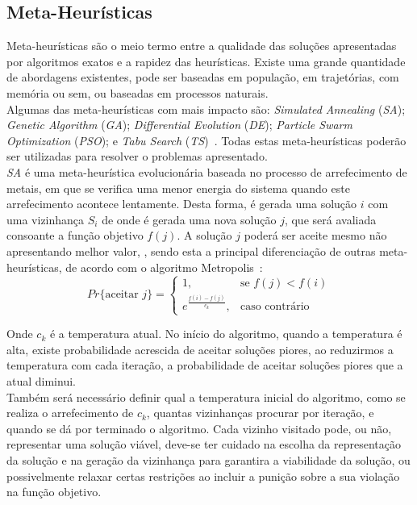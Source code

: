 \subsection{Meta-Heurísticas}

Meta-heurísticas são o meio termo entre a qualidade das soluções apresentadas por algoritmos exatos e a rapidez das heurísticas. Existe uma grande quantidade de abordagens existentes, pode ser baseadas em população, em trajetórias, com memória ou sem, ou baseadas em processos naturais.\\
Algumas das meta-heurísticas com mais impacto são: \textit{Simulated Annealing} (\textit{SA}); \textit{Genetic Algorithm} (\textit{GA}); \textit{Differential Evolution} (\textit{DE}); \textit{Particle Swarm Optimization} (\textit{PSO}); e \textit{Tabu Search} (\textit{TS})~\cite{ezugwuMetaheuristicsComprehensiveOverview2021}. Todas estas meta-heurísticas poderão ser utilizadas para resolver o problemas apresentado.\\

\textit{SA} é uma meta-heurística evolucionária baseada no processo de arrefecimento de metais, em que se verifica uma menor energia do sistema quando este arrefecimento acontece lentamente. Desta forma, é gerada uma solução $i$ com uma vizinhança $S_{i}$ de onde é gerada uma nova solução $j$, que será avaliada consoante a função objetivo $f(j)$. A solução $j$ poderá ser aceite mesmo não apresentando melhor valor, , sendo esta a principal diferenciação de outras meta-heurísticas, de acordo com o algoritmo Metropolis~\cite{metropolisEquationStateCalculations1953}:
$$
Pr\{\text{aceitar } j\}= 
\begin{cases}
	1                         ,& \text{se } f(j)<f(i)\\
    e^{\frac{f(i)-f(j)}{c_{k}}},& \text{caso contrário}
\end{cases}
$$

Onde $c_{k}$ é a temperatura atual. No início do algoritmo, quando a temperatura é alta, existe probabilidade acrescida de aceitar soluções piores, ao reduzirmos a temperatura com cada iteração, a probabilidade de aceitar soluções piores que a atual diminui.\\
Também será necessário definir qual a temperatura inicial do algoritmo, como se realiza o arrefecimento de $c_{k}$, quantas vizinhanças procurar por iteração, e quando se dá por terminado o algoritmo. Cada vizinho visitado pode, ou não, representar uma solução viável, deve-se ter cuidado na escolha da representação da solução e na geração da vizinhança para garantira a viabilidade da solução, ou possivelmente relaxar certas restrições ao incluir a punição sobre a sua violação na função objetivo.\\

